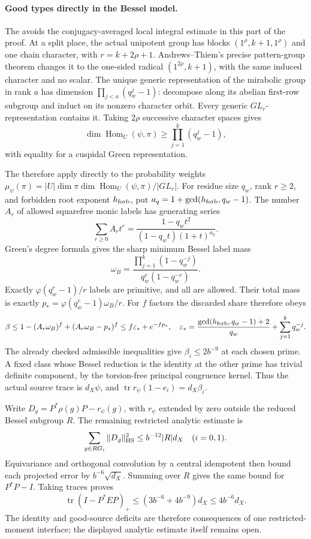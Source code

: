 \paragraph{Good types directly in the Bessel model.}
The  avoids the conjugacy-averaged local integral estimate
in this part of the proof. At a split place, the actual unipotent
group has blocks \((1^\rho,k+1,1^\rho)\) and one chain character,
with \(r=k+2\rho+1\). Andrews--Thiem's precise pattern-group
theorem changes it to the one-sided radical
\((1^{2\rho},k+1)\), with the same induced character and no scalar.
The unique generic representation of the mirabolic group in rank
\(a\) has dimension \(\prod_{j<a}(q_w^j-1)\): decompose along
its abelian first-row subgroup and induct on its nonzero character
orbit. Every generic \(GL_r\)-representation contains it.
Taking \(2\rho\) successive character spaces gives
\[
 \dim\operatorname{Hom}_U(\psi,\pi)
       \ge\prod_{j=1}^k(q_w^j-1),
\]
with equality for a cuspidal Green representation.

The  therefore apply directly to the probability weights
\(\mu_\psi(\pi)=|U|\dim\pi\dim\operatorname{Hom}_U(\psi,\pi)/|GL_r|\).
For residue size \(q_w\), rank \(r\ge2\), and forbidden root
exponent \(h_{\rm forb}\), put
\(a_q=1+\gcd(h_{\rm forb},q_w-1)\). The number \(A_r\) of
allowed squarefree monic labels has generating series
\[
 \sum_{r\ge0}A_r t^r
   =\frac{1-q_wt^2}{(1-q_wt)(1+t)^{a_q}}.
\]
Green's degree formula gives the sharp minimum Bessel label mass
\[
 \omega_B=\frac{\prod_{j=1}^k(1-q_w^{-j})}
                   {q_w^r(1-q_w^{-r})}.
\]
Exactly \(\varphi(q_w^r-1)/r\) labels are primitive, and all
are allowed. Their total mass is exactly
\(p_* =\varphi(q_w^r-1)\omega_B/r\).
For \(f\) factors the discarded share therefore obeys
\[
 \beta\le1-(A_r\omega_B)^f+(A_r\omega_B-p_*)^f
       \le f\varepsilon_*+e^{-fp_*},
 \quad
 \varepsilon_*=
 \frac{\gcd(h_{\rm forb},q_w-1)+2}{q_w}
                   +\sum_{j=1}^k q_w^{-j}.
\]
The already checked admissible inequalities give \(\beta_i\le2b^{-9}\)
at each chosen prime. A fixed class whose Bessel reduction is the
identity at the other prime has trivial definite component, by the
torsion-free principal congruence kernel. Thus the actual source trace
is \(d_X\psi\), and
\(\operatorname{tr}r_\psi(1-e_i)=d_X\beta_i\).

Write \(D_g=P^*\rho(g)P-r_\psi(g)\), with \(r_\psi\) extended by
zero outside the reduced Bessel subgroup \(R\). The remaining
restricted analytic estimate is
\[
 \sum_{g\in RG_i}\|D_g\|_{\rm HS}^2\le b^{-12}|R|d_X
                                      \quad(i=0,1).
\]
Equivariance and orthogonal convolution by a central idempotent
then bound each projected error by \(b^{-6}\sqrt{d_X}\).
Summing over \(R\) gives the same bound for \(P^*P-I\).
Taking traces proves
\[
 \operatorname{tr}(I-P^*EP)_+
       \le(3b^{-6}+4b^{-9})d_X\le4b^{-6}d_X.
\]
The identity and good-source deficits are therefore consequences of
one restricted-moment interface; the displayed analytic estimate
itself remains open.


